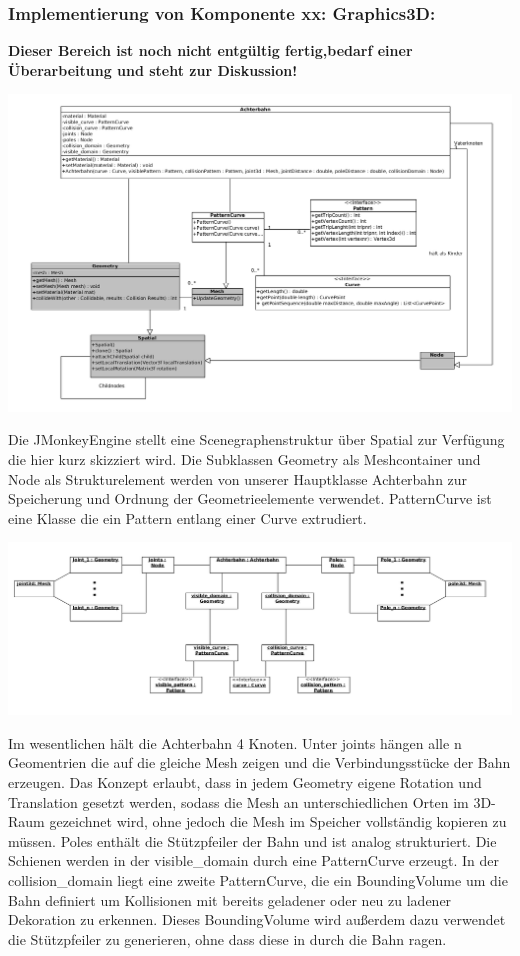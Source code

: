 \subsubsection{Implementierung von Komponente
         xx: Graphics3D:}

\textbf {Dieser Bereich ist noch nicht entgültig fertig,bedarf einer Überarbeitung und steht zur Diskussion!}

\includegraphics[width=\linewidth]{bilder/klassendiagramm_004}

Die JMonkeyEngine stellt eine Scenegraphenstruktur über Spatial zur Verfügung die hier kurz skizziert wird. Die Subklassen Geometry als Meshcontainer und Node als Strukturelement werden von unserer Hauptklasse Achterbahn 
zur Speicherung und Ordnung der Geometrieelemente verwendet. PatternCurve ist eine Klasse die ein Pattern entlang einer Curve extrudiert.

\includegraphics[width=\linewidth]{bilder/objektdiagramm_004}

Im wesentlichen hält die Achterbahn 4 Knoten. Unter joints hängen alle n Geomentrien die auf die gleiche Mesh zeigen und die Verbindungsstücke der Bahn erzeugen. Das Konzept erlaubt, dass in jedem Geometry eigene Rotation und 
Translation gesetzt werden, sodass die Mesh an unterschiedlichen Orten im 3D-Raum gezeichnet wird, ohne jedoch die Mesh im Speicher vollständig kopieren zu müssen. Poles enthält die Stützpfeiler der Bahn und ist analog strukturiert.
Die Schienen werden in der visible\_domain durch eine PatternCurve erzeugt. In der collision\_domain liegt eine zweite PatternCurve, die ein BoundingVolume um die Bahn definiert um Kollisionen mit bereits geladener oder neu zu ladener
Dekoration zu erkennen. Dieses BoundingVolume wird außerdem dazu verwendet die Stützpfeiler zu generieren, ohne dass diese in durch die Bahn ragen.



